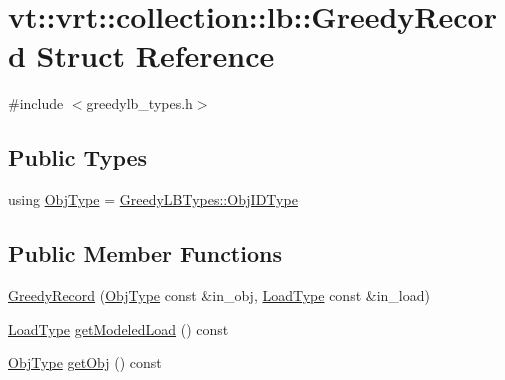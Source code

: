 \hypertarget{structvt_1_1vrt_1_1collection_1_1lb_1_1_greedy_record}{}\section{vt\+:\+:vrt\+:\+:collection\+:\+:lb\+:\+:Greedy\+Record Struct Reference}
\label{structvt_1_1vrt_1_1collection_1_1lb_1_1_greedy_record}


{\ttfamily \#include $<$greedylb\+\_\+types.\+h$>$}

\subsection*{Public Types}
\begin{DoxyCompactItemize}
\item 
using \hyperlink{structvt_1_1vrt_1_1collection_1_1lb_1_1_greedy_record_a6b0754b2434fca9e865fa8422e3d709e}{Obj\+Type} = \hyperlink{structvt_1_1vrt_1_1collection_1_1lb_1_1_greedy_l_b_types_ae22670acd689e4ff83315fac2e4acb5e}{Greedy\+L\+B\+Types\+::\+Obj\+I\+D\+Type}
\end{DoxyCompactItemize}
\subsection*{Public Member Functions}
\begin{DoxyCompactItemize}
\item 
\hyperlink{structvt_1_1vrt_1_1collection_1_1lb_1_1_greedy_record_a150272bcbce22418638bb702093d4bf2}{Greedy\+Record} (\hyperlink{structvt_1_1vrt_1_1collection_1_1lb_1_1_greedy_record_a6b0754b2434fca9e865fa8422e3d709e}{Obj\+Type} const \&in\+\_\+obj, \hyperlink{namespacevt_a8fb51741340b87d7aaee0bef60e9896b}{Load\+Type} const \&in\+\_\+load)
\item 
\hyperlink{namespacevt_a8fb51741340b87d7aaee0bef60e9896b}{Load\+Type} \hyperlink{structvt_1_1vrt_1_1collection_1_1lb_1_1_greedy_record_af9b5d5ee1c115d6bfeb67255267efb57}{get\+Modeled\+Load} () const
\item 
\hyperlink{structvt_1_1vrt_1_1collection_1_1lb_1_1_greedy_record_a6b0754b2434fca9e865fa8422e3d709e}{Obj\+Type} \hyperlink{structvt_1_1vrt_1_1collection_1_1lb_1_1_greedy_record_a5f7a3e144c43f74c587ff054af1e267f}{get\+Obj} () const
\end{DoxyCompactItemize}
